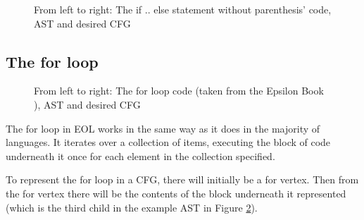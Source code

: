 \begin{figure}
\centering
\begin{minipage}{.3\textwidth}
  \centering
  
\end{minipage}%
\begin{minipage}{.3\textwidth}
  \centering
\end{minipage}
\begin{minipage}{.3\textwidth}
  \centering
\end{minipage}
\caption{From left to right: The if .. else statement without parenthesis' code, AST and desired CFG}
\label{fig:ifelse}
\end{figure}

\subsection{The for loop}

\begin{figure}
\centering
\begin{minipage}{.3\textwidth}
  \centering
  
\end{minipage}%
\begin{minipage}{.3\textwidth}
  \centering
\end{minipage}
\begin{minipage}{.3\textwidth}
  \centering
\end{minipage}
\caption{From left to right: The for loop code (taken from the Epsilon Book \cite{epsilonBook}), AST and desired CFG}
\label{fig:for}
\end{figure}

The for loop in EOL works in the same way as it does in the majority of languages. It iterates over a collection of items, executing the block of code underneath it once for each element in the collection specified.

To represent the for loop in a CFG, there will initially be a for vertex. Then from the for vertex there will be the contents of the block underneath it represented (which is the third child in the example AST in Figure \ref{fig:for}).

